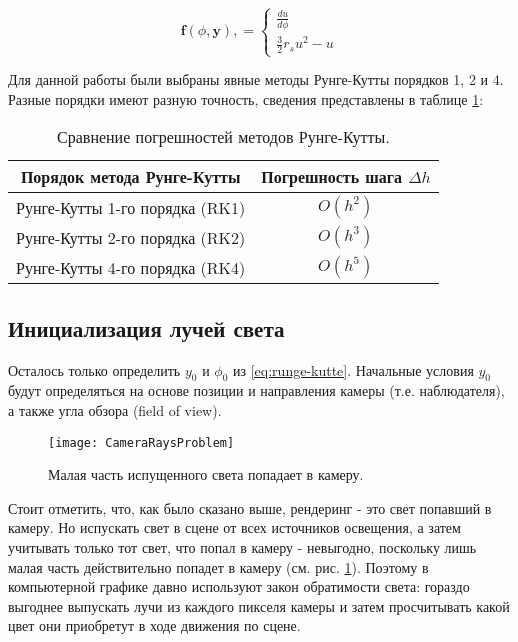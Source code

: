 \begin{equation*}
\label{eq:runge-kutte_f}
    \mathbf{f}(\phi, \mathbf{y}), =
    \begin{cases}
        \frac{du}{d\phi}
        \\
        \frac{3}{2}r_su^2 - u
    \end{cases}
\end{equation*}

Для данной работы были выбраны явные методы Рунге-Кутты порядков 1, 2 и 4. Разные порядки имеют разную точность, сведения представлены в таблице \ref{tab:runge-kutte}:

\begin{center}
    \begin{table}[h!]
        \centering
        \begin{tabular}{|c|c|}
            \hline
            Порядок метода Рунге-Кутты & Погрешность шага $\Delta h$ \\
            \hline
            Рунге-Кутты 1-го порядка (RK1) & $O(h^2)$ \\
            \hline
            Рунге-Кутты 2-го порядка (RK2) & $O(h^3)$ \\
            \hline
            Рунге-Кутты 4-го порядка (RK4) & $O(h^5)$ \\
            \hline
        \end{tabular}
        \caption{Сравнение погрешностей методов Рунге-Кутты.}
        \label{tab:runge-kutte}
    \end{table}
\end{center}


\subsection{Инициализация лучей света}
\label{subsec:ray_init}

Осталось только определить $y_0$ и $\phi_0$ из \eqref{eq:runge-kutte}. Начальные условия $y_0$ будут определяться на основе позиции и направления камеры (т.е. наблюдателя), а также угла обзора (field of view).

\begin{figure}[h]
    \centering
    \texttt{[image: CameraRaysProblem]}
    \caption{Малая часть испущенного света попадает в камеру.}
    \label{fig:camera_rays_problem}
\end{figure}

Стоит отметить, что, как было сказано выше, рендеринг - это свет попавший в камеру. Но испускать свет в сцене от всех источников освещения, а затем учитывать только тот свет, что попал в камеру - невыгодно, поскольку лишь малая часть действительно попадет в камеру (см. рис. \ref{fig:camera_rays_problem}). Поэтому в компьютерной графике давно используют закон обратимости света: гораздо выгоднее выпускать лучи из каждого пикселя камеры и затем просчитывать какой цвет они приобретут в ходе движения по сцене.

